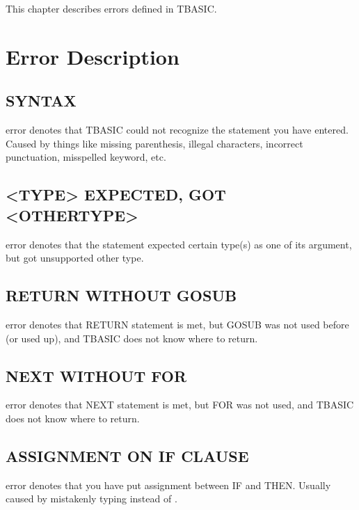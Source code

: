 This chapter describes errors defined in TBASIC.

\section{Error Description}

\subsection{SYNTAX} error denotes that TBASIC could not recognize the statement you have entered. Caused by things like missing parenthesis, illegal characters, incorrect punctuation, misspelled keyword, etc.

\subsection{<TYPE> EXPECTED, GOT <OTHERTYPE>} error denotes that the statement expected certain type(s) as one of its argument, but got unsupported other type.

\subsection{RETURN WITHOUT GOSUB} error denotes that RETURN statement is met, but GOSUB was not used before (or used up), and TBASIC does not know where to return.

\subsection{NEXT WITHOUT FOR} error denotes that NEXT statement is met, but FOR was not used, and TBASIC does not know where to return.

\subsection{ASSIGNMENT ON IF CLAUSE} error denotes that you have put assignment between IF and THEN. Usually caused by mistakenly typing \code{=} instead of \code{==}.